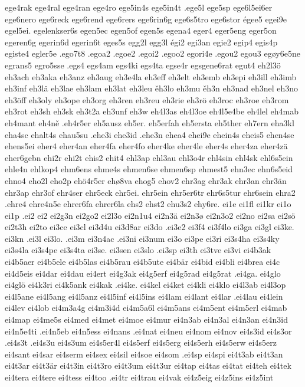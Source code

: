 ege4rak
ege4ral
ege4ran
ege4ro
ege5in4s
ege5in4t
.ege5l
ege5sp
ege6l5ei6er
ege6nero
ege6reck
ege6rend
ege6rers
ege6rin6g
ege6s5tro
ege6stor
égee5
egei9e
egel5ei.
egelenkser6s
egen5ec
egen5of
egen5s
egena4
eger4
eger5eng
eger5on
egeren6g
egerin6d
egerin6t
eges5s
egg2l
egg3l
égi2
egi3an
egie2
egip4
egis4p
egiste4
egler5e
.ego7t8
.egoa2
.egoe2
.egoi2
.egoo2
egori4e
.egou2
egou3
egøy6e5ne
egrans5
egro5sse
.egs4
egs4am
egs4ki
egs4ta
egse4r
egsgene6rat
egut4
eh2l3ö
eh3ach
eh3aka
eh3anz
eh3aug
eh3e4la
eh3eff
eh3elt
eh3emb
eh3epi
eh3ill
eh3imb
eh3inf
eh3lä
eh3lae
eh3lam
eh3lat
eh3leu
ěh3lo
eh3mu
ěh3n
eh3nad
eh3nel
eh3no
eh3öff
eh3oly
eh3ope
eh3org
eh3ren
eh3reu
eh3rie
eh3rö
eh3roc
eh3roe
eh3rom
eh3rot
eh3sh
eh3sk
eh3t2a
eh3unf
eh3w
eh4l3as
eh4l3oe
eh4l5e4be
eh4lel
eh4mab
eh4mant
eh4ně
.eh4r5er
eh5ausz
eh5er.
eh5erfah
eh5ersta
eh5ther
eh7ern
eha3kl
eha4sc
ehalt4s
ehau5su
.ehe3i
ehe3id
.ehe3n
ehea4
ehei9e
ehein4s
eheis5
ehen4se
ehens5ei
eher4
eher4an
eher4fa
eher4fo
eher4ke
eher4le
eher4s
eher4za
eher4zä
eher6gebn
ehi2r
ehi2t
ehis2
ehit4
ehl3ap
ehl3au
ehl3o4r
ehl4sin
ehl4sk
ehl6s5ein
ehle4n
ehlkop4
ehm6ens
ehme4s
ehmen6se
ehmen6sp
ehmest5
ehn3ec
ehn6s5eid
ehno4
eho2l
eho2p
ehö4r5er
ehø8va
ehog5
ehov2
ehr3ag
ehr3ak
ehr3an
ehr3än
ehr3ap
ehr3of
ehr4ser
ehr5eck
ehr5ei.
ehr5ein
ehr5er6tr
ehr6s5tur
ehr6sein
ehra2
.ehre4
ehre4n5e
ehrer6fa
ehrer6la
ehs2
ehst2
ehu3s2
ehy6re.
ei1e
ei1fl
ei1kr
ei1o
ei1p
.ei2
ei2
ei2g3n
ei2go2
ei2l3o
ei2n1u4
ei2n3ä
ei2n3ø
ei2n3o2
ei2no
ei2sa
ei2sö
ei2t3h
ei2to
ei3ce
ei3cl
ei3d4u
ei3d8ar
ei3do
.ei3e2
ei3f4
ei3f4lo
ei3ga
ei3gl
ei3ke.
ei3kn
.ei3l
ei3lo.
.ei3m
ei3n4ac
.ei3ni
ei3num
ei3o
ei3pe
ei3ri
ei3s4ha
ei3s4ky
ei3s4la
ei3s4pe
ei3s4ta
ei3se.
ei3sen
ei3slo
.ei3sp
ei3th
ei3tve
ei3vi
ei4b3ak
ei4b5aer
ei4b5ele
ei4b5las
ei4b5rau
ei4b5ute
ei4bär
ei4bid
ei4bli
ei4brea
ei4c
ei4d5eis
ei4dar
ei4dau
ei4ert
ei4g3ak
ei4g5erf
ei4g5rad
ei4g5rat
.ei4ga.
ei4glo
ei4glö
ei4k3ri
ei4k5ank
ei4kak
.ei4ke.
ei4kel
ei4ket
ei4kli
ei4klo
ei4l3ab
ei4l3op
ei4l5ane
ei4l5ang
ei4l5anz
ei4l5inf
ei4l5ins
ei4lam
ei4lant
ei4lar
.ei4lau
ei4lein
ei4lev
ei4lob
ei4m3a4g
ei4m3i4d
ei4m5a6l
ei4m5ans
ei4m5ent
ei4m5erl
ei4mab
ei4map
ei4me5s
ei4med
ei4met
ei4moe
ei4mur
ei4n3ab
ei4n3al
ei4n3an
ei4n3id
ei4n5e4ti
.ei4n5eb
ei4n5ess
ei4nans
.ei4nat
ei4neu
ei4nom
ei4nov
ei4s3id
ei4s3or
.ei4s3t
.ei4s3u
ei4s3um
ei4s5er4l
ei4s5erf
ei4s5erg
ei4s5erh
ei4s5erw
ei4s5erz
ei4sant
ei4sar
ei4serm
ei4sex
ei4sil
ei4soe
ei4som
.ei4sp
ei4spi
ei4t3ab
ei4t3an
ei4t3ar
ei4t3är
ei4t3in
ei4t3ro
ei4t3um
ei4t3ur
ei4tap
ei4tas
ei4tat
ei4teh
ei4tek
ei4tera
ei4tere
ei4tess
ei4too
.ei4tr
ei4trau
ei4vak
ei4z5eig
ei4z5ins
ei4z5int
